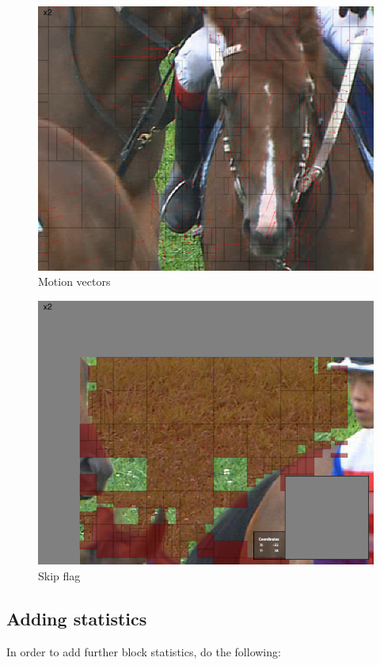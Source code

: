 ﻿\documentclass[a4paper,11pt]{jvetdoc}
\begin{document}
\begin{figure}[htpb]
  \centering
  \includegraphics[width=0.5\linewidth]{figures/raceHorsesShot2MotionVectors}
  \caption{Motion vectors}
  \label{fig:motion-vectors}
\end{figure}


\begin{figure}[htpb]
  \centering
  \includegraphics[width=0.5\linewidth]{figures/raceHorsesShot3SkipFlag}
  \caption{Skip flag}
  \label{fig:skip-flag}
\end{figure}

\subsection{Adding statistics}
\label{sec:adding-statistics}

In order to add further block statistics, do the following:
\end{document}
